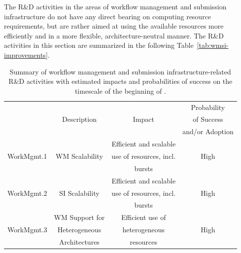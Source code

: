 The R\&D activities in the areas of workflow management and submission infrastructure do not have any direct bearing on computing resource requirements, but are rather aimed at using the available resources more efficiently and in a more flexible, architecture-neutral manner. The R\&D activities in this section are summarized in the following Table~\ref{tab:wmsi-improvements}.

\begin{table}[tbph]
    \centering
    \caption{Summary of workflow management and submission infrastructure-related R\&D activities with estimated impacts and probabilities of success on the timescale of the beginning of \RunFour.}
    \begin{tabular}{|c|c|c|c|}
    \hline
    \rowcolor{tableheader} 
           &                          &                           & Probability     \\ 
    \rowcolor{tableheader}
           & Description              &       Impact              & of Success      \\ 
    \rowcolor{tableheader}
           &                          &                           & and/or Adoption \\ \hline
    \cellcolor{tablerowheader}
           &                          &  Efficient and scalable  &                 \\
    \cellcolor{tablerowheader}
WorkMgmt.1 &  WM Scalability          &  use of resources, incl.  &    High         \\
    \cellcolor{tablerowheader}
           &                          &  bursts                   &                 \\ \hline
    \cellcolor{tablerowheader}
           &                          &  Efficient and scalable  &                 \\
    \cellcolor{tablerowheader}
WorkMgmt.2 & SI Scalability           &  use of resources, incl.  &    High         \\
    \cellcolor{tablerowheader}
           &                          &  bursts                   &                 \\ \hline
    \cellcolor{tablerowheader}
           &  WM Support for          &  Efficient use of         &                 \\
    \cellcolor{tablerowheader}
WorkMgmt.3 &  Heterogeneous           &  heterogeneous            &    High        \\
    \cellcolor{tablerowheader}
           &  Architectures           &  resources                &                 \\ \hline

\end{tabular}
\end{table}
